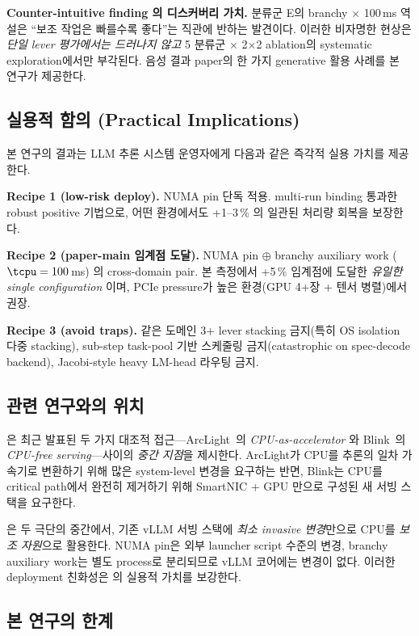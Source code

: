 \textbf{Counter-intuitive finding 의 디스커버리 가치.}
분류군 E의 branchy $\times$ 100\,ms 역설은 ``보조 작업은 빠를수록 좋다''는 직관에 반하는 발견이다.
이러한 비자명한 현상은 \emph{단일 lever 평가에서는 드러나지 않고} 5 분류군 $\times$ 2$\times$2 ablation의 systematic exploration에서만 부각된다.
음성 결과 paper의 한 가지 generative 활용 사례를 본 연구가 제공한다.

\subsection{실용적 함의 (Practical Implications)}

본 연구의 결과는 LLM 추론 시스템 운영자에게 다음과 같은 즉각적 실용 가치를 제공한다.

\textbf{Recipe 1 (low-risk deploy).}
NUMA pin 단독 적용. multi-run binding 통과한 robust positive 기법으로, 어떤 환경에서도 +1--3\,\% 의 일관된 처리량 회복을 보장한다.

\textbf{Recipe 2 (paper-main 임계점 도달).}
NUMA pin $\oplus$ branchy auxiliary work ($\tcpu = 100$\,ms) 의 cross-domain pair.
본 측정에서 +5\,\% 임계점에 도달한 \emph{유일한 single configuration} 이며, PCIe pressure가 높은 환경(GPU 4+장 + 텐서 병렬)에서 권장.

\textbf{Recipe 3 (avoid traps).}
같은 도메인 3+ lever stacking 금지(특히 OS isolation 다중 stacking), sub-step task-pool 기반 스케줄링 금지(catastrophic on spec-decode backend), Jacobi-style heavy LM-head 라우팅 금지.

\subsection{관련 연구와의 위치}

\algname 은 최근 발표된 두 가지 대조적 접근---ArcLight~\cite{xu2026arclight}의 \emph{CPU-as-accelerator} 와 Blink~\cite{siavashi2026blink}의 \emph{CPU-free serving}---사이의 \emph{중간 지점}을 제시한다.
ArcLight가 CPU를 추론의 일차 가속기로 변환하기 위해 많은 system-level 변경을 요구하는 반면, Blink는 CPU를 critical path에서 완전히 제거하기 위해 SmartNIC + GPU 만으로 구성된 새 서빙 스택을 요구한다.

\algname 은 두 극단의 중간에서, 기존 vLLM 서빙 스택에 \emph{최소 invasive 변경}만으로 CPU를 \emph{보조 자원}으로 활용한다.
NUMA pin은 외부 launcher script 수준의 변경, branchy auxiliary work는 별도 process로 분리되므로 vLLM 코어에는 변경이 없다.
이러한 deployment 친화성은 \algname 의 실용적 가치를 보강한다.

\subsection{본 연구의 한계}

